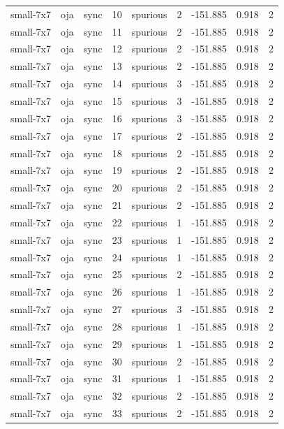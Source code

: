 \begin{tabular}{lllrlrrrr}
small-7x7 & oja & sync & 10 & spurious & 2 & -151.885 & 0.918 & 2 \\
small-7x7 & oja & sync & 11 & spurious & 2 & -151.885 & 0.918 & 2 \\
small-7x7 & oja & sync & 12 & spurious & 2 & -151.885 & 0.918 & 2 \\
small-7x7 & oja & sync & 13 & spurious & 2 & -151.885 & 0.918 & 2 \\
small-7x7 & oja & sync & 14 & spurious & 3 & -151.885 & 0.918 & 2 \\
small-7x7 & oja & sync & 15 & spurious & 3 & -151.885 & 0.918 & 2 \\
small-7x7 & oja & sync & 16 & spurious & 3 & -151.885 & 0.918 & 2 \\
small-7x7 & oja & sync & 17 & spurious & 2 & -151.885 & 0.918 & 2 \\
small-7x7 & oja & sync & 18 & spurious & 2 & -151.885 & 0.918 & 2 \\
small-7x7 & oja & sync & 19 & spurious & 2 & -151.885 & 0.918 & 2 \\
small-7x7 & oja & sync & 20 & spurious & 2 & -151.885 & 0.918 & 2 \\
small-7x7 & oja & sync & 21 & spurious & 2 & -151.885 & 0.918 & 2 \\
small-7x7 & oja & sync & 22 & spurious & 1 & -151.885 & 0.918 & 2 \\
small-7x7 & oja & sync & 23 & spurious & 1 & -151.885 & 0.918 & 2 \\
small-7x7 & oja & sync & 24 & spurious & 1 & -151.885 & 0.918 & 2 \\
small-7x7 & oja & sync & 25 & spurious & 2 & -151.885 & 0.918 & 2 \\
small-7x7 & oja & sync & 26 & spurious & 1 & -151.885 & 0.918 & 2 \\
small-7x7 & oja & sync & 27 & spurious & 3 & -151.885 & 0.918 & 2 \\
small-7x7 & oja & sync & 28 & spurious & 1 & -151.885 & 0.918 & 2 \\
small-7x7 & oja & sync & 29 & spurious & 1 & -151.885 & 0.918 & 2 \\
small-7x7 & oja & sync & 30 & spurious & 2 & -151.885 & 0.918 & 2 \\
small-7x7 & oja & sync & 31 & spurious & 1 & -151.885 & 0.918 & 2 \\
small-7x7 & oja & sync & 32 & spurious & 2 & -151.885 & 0.918 & 2 \\
small-7x7 & oja & sync & 33 & spurious & 2 & -151.885 & 0.918 & 2 \\

\end{tabular}
